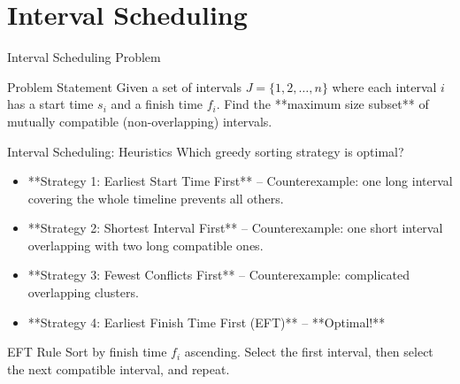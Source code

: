 \documentclass[aspectratio=169,xcolor=dvipsnames]{beamer}
\begin{document}
\section{Interval Scheduling}

\begin{frame}{Interval Scheduling Problem}
  \begin{block}{Problem Statement}
    Given a set of intervals $J = \{1, 2, \ldots, n\}$ where each interval $i$ has a start time $s_i$ and a finish time $f_i$. Find the **maximum size subset** of mutually compatible (non-overlapping) intervals.
  \end{block}
  \begin{center}
  \end{center}
\end{frame}

\begin{frame}{Interval Scheduling: Heuristics}
  Which greedy sorting strategy is optimal?
  \begin{itemize}
    \item **Strategy 1: Earliest Start Time First** -- Counterexample: one long interval covering the whole timeline prevents all others.
    \item **Strategy 2: Shortest Interval First** -- Counterexample: one short interval overlapping with two long compatible ones.
    \item **Strategy 3: Fewest Conflicts First** -- Counterexample: complicated overlapping clusters.
    \item **Strategy 4: Earliest Finish Time First (EFT)** -- **Optimal!**
  \end{itemize}
  \begin{exampleblock}{EFT Rule}
    Sort by finish time $f_i$ ascending. Select the first interval, then select the next compatible interval, and repeat.
  \end{exampleblock}
\end{frame}
\end{document}
